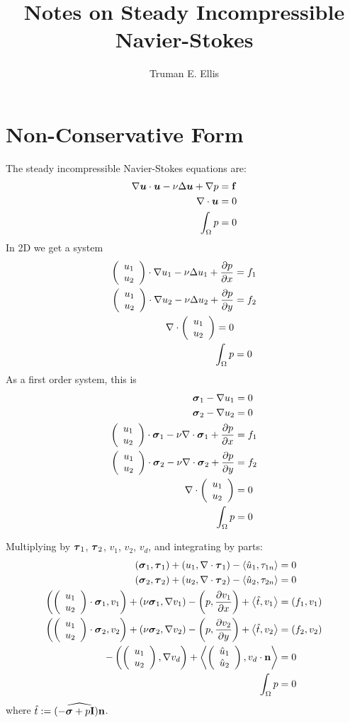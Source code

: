 \documentclass{article}
\author{Truman E. Ellis}
\title{Notes on Steady Incompressible Navier-Stokes}
\begin{document}
\maketitle

\section*{Non-Conservative Form}
The steady incompressible Navier-Stokes equations are:
\begin{align*}
  \nabla \boldsymbol u\cdot\boldsymbol u-\nu\Delta\boldsymbol u+\nabla p&=\mathbf{f}\\
  \nabla\cdot\boldsymbol u&=0\\
  \int_\Omega p&=0
\end{align*}
In 2D we get a system
\begin{align*}
  \left( \begin{array}{c} u_1\\ u_2\\ \end{array} \right)\cdot\nabla u_1
  -\nu\Delta u_1+\frac{\partial p}{\partial x}
  &=f_1\\
  \left( \begin{array}{c} u_1\\ u_2\\ \end{array} \right)\cdot\nabla u_2
  -\nu\Delta u_2+\frac{\partial p}{\partial y}
  &=f_2\\
  \nabla\cdot{\left( \begin{array}{c} u_1\\ u_2\\ \end{array} \right)}=0\\
  \int_\Omega p&=0
\end{align*}
As a first order system, this is
\begin{align*}
  \boldsymbol\sigma_1-\nabla u_1&=0\\
  \boldsymbol\sigma_2-\nabla u_2&=0\\
  \left( \begin{array}{c} u_1\\ u_2\\ \end{array} \right)\cdot\boldsymbol\sigma_1
  -\nu\nabla\cdot\boldsymbol\sigma_1+\frac{\partial p}{\partial x}
  &=f_1\\
  \left( \begin{array}{c} u_1\\ u_2\\ \end{array} \right)\cdot\boldsymbol\sigma_2
  -\nu\nabla\cdot\boldsymbol\sigma_2+\frac{\partial p}{\partial y}
  &=f_2\\
  \nabla\cdot\left( \begin{array}{c} u_1\\ u_2\\ \end{array} \right)&=0\\
  \int_\Omega p&=0
\end{align*}

Multiplying by $\boldsymbol\tau_1$, $\boldsymbol\tau_2$, $v_1$, $v_2$, $v_d$, and integrating by
parts:
\begin{align*}
  \left( \boldsymbol\sigma_1,\boldsymbol\tau_1 \right)
  +\left( u_1,\nabla\cdot\boldsymbol\tau_1 \right)
  -\left\langle \hat u_1,\tau_{1n} \right\rangle&=0\\
  \left( \boldsymbol\sigma_2,\boldsymbol\tau_2 \right)
  +\left( u_2,\nabla\cdot\boldsymbol\tau_2 \right)
  -\left\langle \hat u_2,\tau_{2n} \right\rangle&=0\\
  \left( \left( \begin{array}{c} u_1\\ u_2\\ \end{array} \right)\cdot\boldsymbol\sigma_1,v_1 \right)
  +\left( \nu\boldsymbol\sigma_1,\nabla v_1 \right)
  -\left( p,\frac{\partial v_1}{\partial x} \right)
  +\left\langle \hat t,v_1 \right\rangle&=\left( f_1,v_1 \right)\\
  \left( \left( \begin{array}{c} u_1\\ u_2\\ \end{array} \right)\cdot\boldsymbol\sigma_2,v_2 \right)
  +\left( \nu\boldsymbol\sigma_2,\nabla v_2 \right)
  -\left( p,\frac{\partial v_2}{\partial y} \right)
  +\left\langle \hat t,v_2 \right\rangle&=\left( f_2,v_2 \right)\\
  -\left( \left( \begin{array}{c} u_1\\ u_2\\ \end{array} \right),\nabla v_d \right)
  +\left\langle \left( \begin{array}{c} \hat u_1\\ \hat u_2\\ \end{array} \right),v_d\cdot\mathbf{n} \right\rangle&=0\\
  \int_\Omega p&=0
\end{align*}
where $\hat t:=\widehat{(-\boldsymbol\sigma+p\mathbf{I})\mathbf{n}}$.
\end{document}
